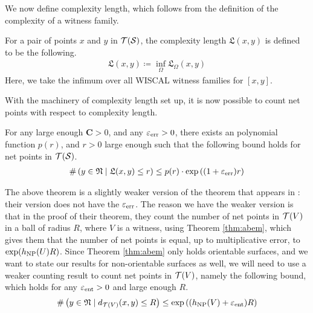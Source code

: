 We now define complexity length, which follows from the definition of the complexity of a witness family.

\begin{definition}
  \label{defn:complexity-length}
  For a pair of points $x$ and $y$ in $\mathcal{T}(\mathcal{S})$, the complexity length $\mathfrak{L}(x,y)$ is defined to be the following.
  \begin{align*}
    \mathfrak{L}(x,y) \coloneqq \inf_{\Omega} \mathfrak{L}_{\Omega}(x,y)
  \end{align*}
  Here, we take the infimum over all WISCAL witness families for $[x,y]$.
\end{definition}

With the machinery of complexity length set up, it is now possible to count net points with respect to complexity length.

\begin{theorem}
  \label{thm:counting-with-complexity}
  For any large enough $\mathbf{C} > 0$, and any $\varepsilon_{\mathrm{err}} > 0$, there exists an polynomial function $p(r)$, and $r > 0$ large enough such that the following bound holds for net points in $\mathcal{T}(\mathcal{S})$.
  \begin{align*}
    \# \left( y \in \mathfrak{N} \mid \mathfrak{L}(x,y) \leq r \right) \leq p(r) \cdot \exp\left( (1+\varepsilon_{\mathrm{err}})r \right)
  \end{align*}
\end{theorem}

\begin{remark}
  The above theorem is a slightly weaker version of the theorem that appears in \textcite{dowdall2023lattice}: their version does not have the $\varepsilon_{\mathrm{err}}$.
  The reason we have the weaker version is that in the proof of their theorem, they count the number of net points in $\mathcal{T}(V)$ in a ball of radius $R$, where $V$ is a witness, using Theorem \ref{thm:abem}, which gives them that the number of net points is equal, up to multiplicative error, to $\exp(h_{\mathrm{NP}}(U) R)$.
  Since Theorem \ref{thm:abem} only holds orientable surfaces, and we want to state our results for non-orientable surfaces as well, we will need to use a weaker counting result to count net points in $\mathcal{T}(V)$, namely the following bound, which holds for any $\varepsilon_{\mathrm{ent}} > 0$ and large enough $R$.
  \begin{align*}
    \#\left( y \in \mathfrak{N} \mid d_{\mathcal{T}(V)}(x, y) \leq R \right) \leq \exp\left( (h_{\mathrm{NP}}(V) + \varepsilon_{\mathrm{ent}} ) R \right)
  \end{align*}
\end{remark}

